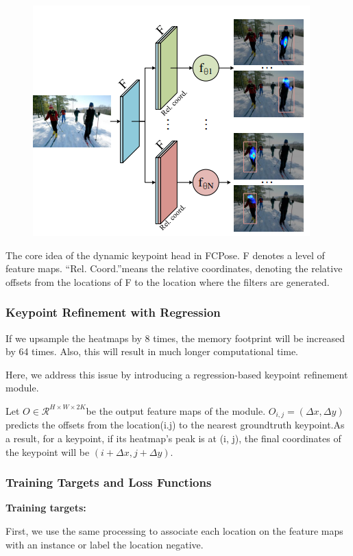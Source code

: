 \documentclass[11pt]{article}
\begin{document}
\begin{figure}[h]
	\centering
	\includegraphics[scale = 0.5]{10}
\end{figure}

The core idea of the dynamic keypoint head in FCPose. F denotes a level of feature maps. “Rel. Coord.”means the relative coordinates, denoting the relative offsets from the locations of F to the location where the filters are generated.

\subsubsection{Keypoint Refinement with Regression}
If we upsample the heatmaps by 8 times, the memory footprint will be increased by 64 times. Also, this will result in much longer computational time.

Here, we address this issue by introducing a regression-based keypoint refinement module. 

Let $O\in \mathcal{R}^{H\times W\times 2K}$be the output feature maps of the module. $O_{i,j} = (\Delta x,\Delta y)$ predicts the offsets from the location(i.j) to the nearest groundtruth keypoint.As a result, for a keypoint, if its heatmap’s peak is at (i, j), the final coordinates of the keypoint will be $(i + \Delta x,j + \Delta y)$.

\subsubsection{Training Targets and Loss Functions}
\textbf{Training targets:}

First, we use the same processing to associate each location on the feature maps with an instance or label the location negative.
\end{document}
